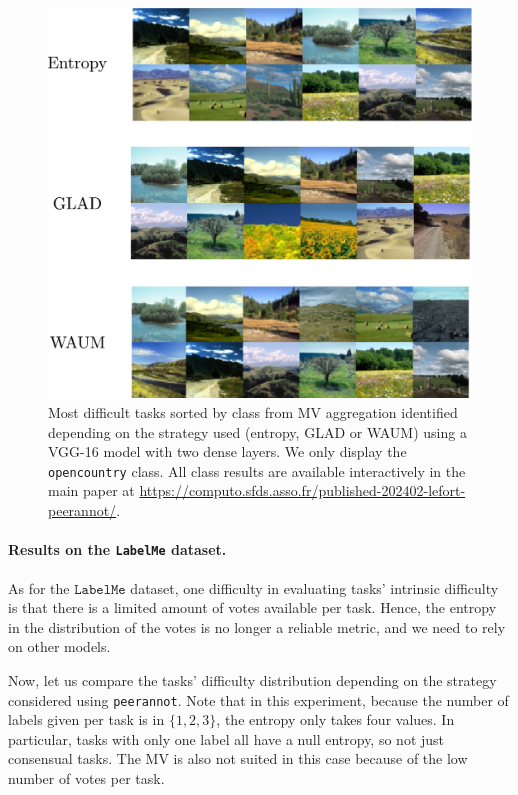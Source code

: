 \begin{figure}[htb]
    \centering
    \includegraphics[width=.8\textwidth]{./images_peerannot/labelme_identification.pdf}
    \caption{Most difficult tasks sorted by class from MV aggregation identified depending on the strategy used (entropy, GLAD or WAUM) using a VGG-16 model with two dense layers. We only display the \texttt{opencountry} class. All class results are available interactively in the main paper at \url{https://computo.sfds.asso.fr/published-202402-lefort-peerannot/}.}
    \label{fig:identfication_labelme}
\end{figure}

\paragraph{Results on the \texttt{LabelMe} dataset.}

As for the $\texttt{LabelMe}$ dataset, one difficulty in evaluating tasks' intrinsic difficulty is that there is a limited amount of votes available per task.
Hence, the entropy in the distribution of the votes is no longer a reliable metric, and we need to rely on other models.

Now, let us compare the tasks' difficulty distribution depending on the strategy considered using \texttt{peerannot}.
Note that in this experiment, because the number of labels given per task is in $\{1,2,3\}$, the entropy only takes four values.
In particular, tasks with only one label all have a null entropy, so not just consensual tasks.
The MV is also not suited in this case because of the low number of votes per task.


